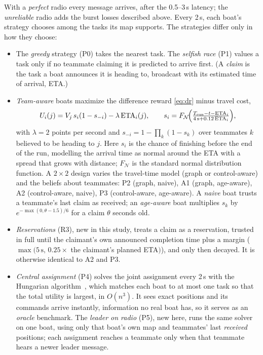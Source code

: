 \documentclass[11pt]{article}
\theoremstyle{definition}
\begin{document}
With a \emph{perfect} radio every message arrives, after the 0.5--3\,s latency; the \emph{unreliable} radio adds the burst losses described above. Every 2\,s, each boat's strategy chooses among the tasks its map supports. The strategies differ only in how they choose:
\begin{itemize}
\item The \emph{greedy} strategy (P0) takes the nearest task. The \emph{selfish race} (P1) values a task only if no teammate claiming it is predicted to arrive first. (A \emph{claim} is the task a boat announces it is heading to, broadcast with its estimated time of arrival, ETA.)
\item \emph{Team-aware} boats maximize the difference reward \eqref{eq:dr} minus travel cost,
\begin{equation}
U_i(j)=V_j\,s_i(1-s_{-i})-\lambda\,\mathrm{ETA}_i(j),\qquad s_i=F_{\mathcal N}\!\Big(\tfrac{T_{\rm run}-t-\mathrm{ETA}_i}{4\,\mathrm s+0.12\,\mathrm{ETA}_i}\Big),\label{eq:mc}
\end{equation}
with $\lambda=2$ points per second and $s_{-i}=1-\prod_k(1-s_k)$ over teammates $k$ believed to be heading to $j$. Here $s_i$ is the chance of finishing before the end of the run, modelling the arrival time as normal around the ETA with a spread that grows with distance; $F_{\mathcal N}$ is the standard normal distribution function. A $2\times2$ design varies the travel-time model (graph or control-aware) and the beliefs about teammates: P2 (graph, naive), A1 (graph, age-aware), A2 (control-aware, naive), P3 (control-aware, age-aware). A \emph{naive} boat trusts a teammate's last claim as received; an \emph{age-aware} boat multiplies $s_k$ by $e^{-\max(0,\theta-1.5)/6}$ for a claim $\theta$ seconds old.
\item \emph{Reservations} (R3), new in this study, treats a claim as a reservation, trusted in full until the claimant's own announced completion time plus a margin ($\max(5\,\mathrm s,\,0.25\times$ the claimant's planned ETA$)$), and only then decayed. It is otherwise identical to A2 and P3.
\item \emph{Central assignment} (P4) solves the joint assignment every 2\,s with the Hungarian algorithm~\cite{kuhn1955}, which matches each boat to at most one task so that the total utility is largest, in $O(n^3)$. It sees exact positions and its commands arrive instantly, information no real boat has, so it serves as an \emph{oracle} benchmark. The \emph{leader on radio} (P5), new here, runs the same solver on one boat, using only that boat's own map and teammates' last \emph{received} positions; each assignment reaches a teammate only when that teammate hears a newer leader message.
\end{itemize}
\end{document}
